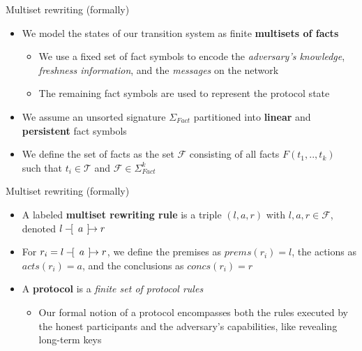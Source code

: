 \documentclass[11pt,aspectratio=169]{beamer}
\begin{document}
\begin{frame}[fragile]{Multiset rewriting (formally)}
    \begin{itemize}
        \item We model the states of our transition system as finite
              \textbf{multisets of facts}
        \begin{itemize}
            \item We use a fixed set of fact symbols to encode the
                  \textit{adversary's knowledge},
                  \textit{freshness information}, and the
                  \textit{messages} on the network
            \item The remaining fact symbols are used to represent the protocol 
                  state
        \end{itemize}
        \item We assume an unsorted signature $\Sigma_{Fact}$ partitioned into 
              \textbf{linear} and \textbf{persistent} fact symbols
        \item We define the set of facts as the set $\mathcal{F}$ consisting of 
              all facts $F(t_1, .., t_k)$ such that $t_i \in \mathcal{T}$ and 
              $\mathcal{F} \in \Sigma^k_{Fact}$
    \end{itemize}
\end{frame}

\begin{frame}[fragile]{Multiset rewriting (formally)}
    \begin{itemize}
        \item A labeled \textbf{multiset rewriting rule} is a triple $(l,a,r)$ 
              with $l,a,r \in \mathcal{F}$, denoted
              $l -\hspace{-4pt}[\hspace{5pt} a \hspace{4pt}]\hspace{-4.6pt}\rightarrow r$
        \item For $r_i = l -\hspace{-4pt}[\hspace{5pt} a \hspace{4pt}]\hspace{-4.6pt}\rightarrow r$, we define the 
              premises as $prems(r_i) = l$, the actions as $acts(r_i) = a$, and 
              the conclusions as $concs(r_i) = r$
        \item A \textbf{protocol} is a \textit{finite set of protocol rules}
        \begin{itemize}
            \item Our formal notion of a protocol encompasses both the rules 
                  executed by the honest participants and the adversary's 
                  capabilities, like revealing long-term keys
        \end{itemize}
    \end{itemize}
\end{frame}
\end{document}
